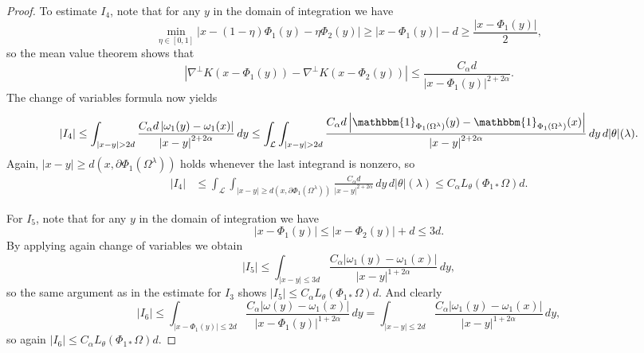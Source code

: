 \documentclass[reqno,centertags,12pt]{amsart}
\theoremstyle{definition}
\numberwithin{equation}{section}
\newcommand{\abs}[1]{\left\lvert#1\right\rvert}
\newcommand{\tht}{\theta}
\begin{document}
\begin{proof}
    To estimate $I_{4}$, note that for any $y$ in the domain of integration we have
    \[
        \min_{\eta\in[0,1]}
        \abs{x - (1-\eta)\Phi_{1}(y) - \eta\Phi_{2}(y)}
        \geq \abs{x - \Phi_{1}(y)} - d
        \geq \frac{\abs{x - \Phi_{1}(y)}}{2},
    \]
     so the mean value theorem shows that
    \[
        \abs{\nabla^{\perp}K(x - \Phi_{1}(y)) - \nabla^{\perp}K(x - \Phi_{2}(y))}
        \leq \frac{C_{\alpha}d}{\abs{x - \Phi_{1}(y)}^{2 + 2\alpha}}.
    \]
    The change of variables formula now yields
    \[
        \abs{I_{4}} \leq \int_{\abs{x - y} > 2d}
        \frac{C_{\alpha}d\abs{\omega_{1}(y) - \omega_{1}(x)}}
        {\abs{x - y}^{2 + 2\alpha}}\,dy
        \leq \int_{\mathcal{L}}\int_{\abs{x - y} > 2d}
        \frac{C_{\alpha}d\abs{\mathbbm{1}_{\Phi_{1}(\Omega^{\lambda})}(y)
        - \mathbbm{1}_{\Phi_{1}(\Omega^{\lambda})}(x)}}
        {\abs{x - y}^{2 + 2\alpha}}\,dy\,d|\theta|(\lambda).
    \]
    Again, $\abs{x - y} \geq d(x,\partial\Phi_{1}(\Omega^{\lambda}))$
    holds whenever the last integrand  is nonzero, so
    \begin{align*}
        \abs{I_{4}} &\leq \int_{\mathcal{L}}
        \int_{\abs{x - y}\geq d(x,\partial\Phi_{1}(\Omega^{\lambda}))}
        \frac{C_{\alpha}d}{\abs{x - y}^{2+2\alpha}}\,dy\,d|\theta|(\lambda)
        \leq C_{\alpha}L_{\tht}(\Phi_{1*}\Omega)d.
    \end{align*}

    For $I_{5}$, note that for any $y$ in the domain of integration we have
    \[
        \abs{x - \Phi_{1}(y)} \leq \abs{x - \Phi_{2}(y)} + d \leq 3d.
    \]
    By applying again  change of variables we obtain
    \[
        \abs{I_{5}} \leq \int_{\abs{x - y} \leq 3d}
        \frac{C_{\alpha}\abs{\omega_{1}(y) - \omega_{1}(x)}}{\abs{x - y}^{1 + 2\alpha}}\,dy,
    \]
    so the same argument as in the estimate for $I_{3}$
    shows $\abs{I_{5}} \leq C_{\alpha}L_{\tht}(\Phi_{1*}\Omega)d$.
And clearly
    \[
        \abs{I_{6}} \leq \int_{\abs{x - \Phi_{1}(y)} \leq 2d}
        \frac{C_{\alpha}\abs{\omega(y) - \omega_{1}(x)}}
        {\abs{x - \Phi_{1}(y)}^{1+2\alpha}}\,dy
        = \int_{\abs{x - y}\leq 2d}\frac{C_{\alpha}\abs{\omega_{1}(y) - \omega_{1}(x)}}
        {\abs{x - y}^{1+2\alpha}}\,dy,
    \]
    so again $\abs{I_{6}} \leq C_{\alpha}L_{\tht}(\Phi_{1*}\Omega)d$.


\end{proof}
\end{document}
